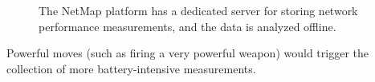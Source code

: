 \begin{figure}[hbtp]
  \caption{
    The NetMap platform has a dedicated server for storing network
    performance measurements, and the data is analyzed offline.
  }
  \label{fig:dataflow}
\end{figure}


Powerful moves (such as firing a very powerful
weapon) would trigger the collection of more battery-intensive measurements.



\section{}




